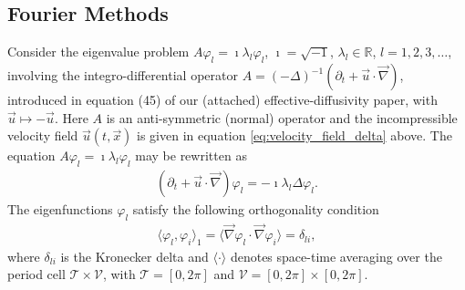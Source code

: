 \documentclass[11pt]{amsart}
\newcommand{\Tc}{\mathcal{T}}
\newcommand{\Vc}{\mathcal{V}}
\begin{document}
\subsection{Fourier Methods}\label{sec:Fourier_Methods}
%
Consider the eigenvalue problem $A\varphi_l=\imath\lambda_l\varphi_l$, $\imath=\sqrt{-1}$,
$\lambda_l\in\mathbb{R}$, $l=1,2,3,\ldots$, involving the integro-differential operator
$A=(-\Delta)^{-1}(\partial_t+\vec{u}\cdot\vec{\nabla})$,  
introduced in equation (45) of our (attached) effective-diffusivity
paper, with $\vec{u}\mapsto-\vec{u}$. Here $A$ is an anti-symmetric (normal)
operator and the incompressible velocity field
$\vec{u}(t,\vec{x})$
is given in equation \eqref{eq:velocity_field_delta} above. The equation $A\varphi_l=\imath\lambda_l\varphi_l$ may be
rewritten as     
%
\begin{align}\label{eq:Eig_prob}
  (\partial_t+\vec{u}\cdot\vec{\nabla})\varphi_l=-\imath\lambda_l\Delta\varphi_l.
\end{align}
%
The eigenfunctions $\varphi_l$ satisfy the following orthogonality condition
%
\begin{align}\label{eq:Orthogonal}
  \langle\varphi_l,\varphi_i\rangle_1=\langle\vec{\nabla}\varphi_l\cdot\vec{\nabla}\varphi_i\rangle=\delta_{li},
\end{align}
%
where $\delta_{li}$ is the Kronecker delta and $\langle\cdot\rangle$ denotes space-time
averaging over the period cell $\Tc\times\Vc$, with $\Tc=[0,2\pi]$ and
$\Vc=[0,2\pi]\times[0,2\pi]$.
\end{document}
